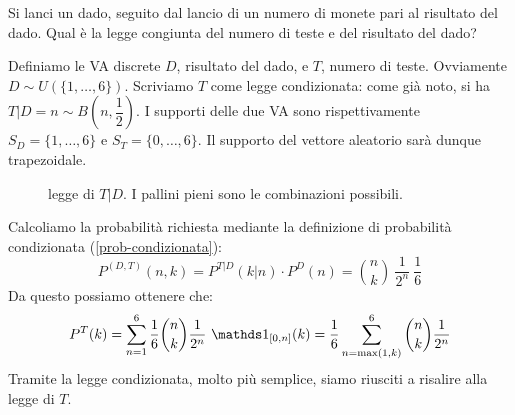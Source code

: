 \begin{ese}\label{ese-dadi-monete-teste}
  Si lanci un dado, seguito dal lancio di un numero di monete pari al risultato del dado.
  Qual è la legge congiunta del numero di teste e del risultato del dado?

  Definiamo le VA discrete $D$, risultato del dado, e $T$, numero di teste. Ovviamente $D \sim U(\{ 1, \dots, 6\})$.
  Scriviamo $T$ come legge condizionata: come già noto, si ha $T | D=n \sim B \left( n, \dfrac 1 2 \right)$.
  I supporti delle due VA sono rispettivamente $S_D = \{ 1, \dots, 6 \}$ e $S_T = \{ 0, \dots, 6 \}$. Il supporto del vettore aleatorio sarà dunque trapezoidale.

  \begin{figure}[H]
    \centering
    \caption{legge di $T|D$. I pallini pieni sono le combinazioni possibili.}
  \end{figure}

  Calcoliamo la probabilità richiesta mediante la definizione di probabilità condizionata (\ref{prob-condizionata}):
  $$P^{(D, T)}(n, k) = P^{T|D}(k|n) \cdot P^D(n) = \binom{n}{k} \ \frac 1 {2^n} \ \frac 1 6$$
  Da questo possiamo ottenere che:
  $$P^T(k)= \sum_{n=1}^{6} \frac{1}{6} \binom{n}{k} \frac{1}{2^n} \ \Ind_{[0,n]}(k)
  = \frac{1}{6} \sum\limits_{n = \max(1,k)}^6 \binom{n}{k} \frac{1}{2^n}$$
  Tramite la legge condizionata, molto più semplice, siamo riusciti a risalire alla legge di $T$.
\end{ese}

